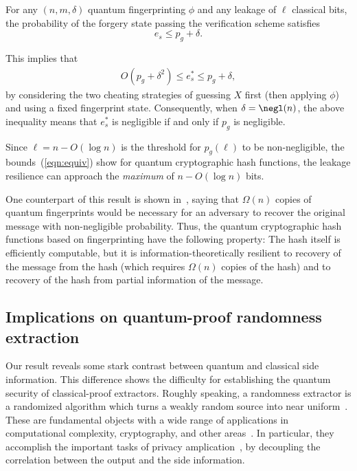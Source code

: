 \begin{lemma}
    \label{lem:sep} For any $(n, m, \delta)$ quantum fingerprinting $\phi$ and any leakage of $\ell$ classical bits, the probability of the forgery state passing the verification scheme satisfies   $$e_s\leq p_g +\delta.$$
\end{lemma}

This implies that
\begin{align}\label{eqn:equiv}
O(p_g + \delta^2) \le e^*_s\leq p_g + \delta,
\end{align}
by considering the two cheating strategies of guessing $X$ first (then applying $\phi$) and using a fixed fingerprint state. Consequently, when $\delta=\negl(n)$, the above inequality means that $e^*_s$ is negligible if and only if $p_g$ is negligible. 

Since $\ell=n-O(\log n)$ is the threshold for $p_g(\ell)$ to be non-negligible, the bounds~(\ref{eqn:equiv}) show for  quantum cryptographic hash functions, the leakage resilience can approach the {\em maximum} of  $n-O(\log n)$ bits. 

One counterpart of this result is shown in~\cite{arunachalam2016optimal}, saying that $\Omega(n)$ copies of quantum fingerprints would be necessary for an adversary to recover the original message with non-negligible probability. Thus, the quantum cryptographic hash functions based on fingerprinting have the following property: The hash itself is efficiently computable, but it is information-theoretically resilient to recovery of the message from the hash (which requires
$\Omega(n)$
copies of the hash) and to recovery of the hash from partial information of the message.


\subsection{Implications on quantum-proof randomness extraction}
Our result reveals some stark contrast between quantum and classical side information. This difference shows the difficulty for establishing the quantum security of classical-proof extractors. Roughly speaking, a randomness extractor is a randomized algorithm which turns a weakly random source into near uniform~\cite{nisan1992pseudorandom,nisan1996randomness,trevisan2001extractors}. These are fundamental objects with a wide range of applications in computational complexity, cryptography, and other areas~\cite{bennett1985reduce,dodis2009non,goldreich1997another,sudan1999pseudorandom,moshkovitz2014parallel}.
In particular, they accomplish the important tasks of privacy amplication~\cite{bennett1995generalized,bennett1985reduce,maurer1993secret}, by decoupling the correlation between the output and the side information.

